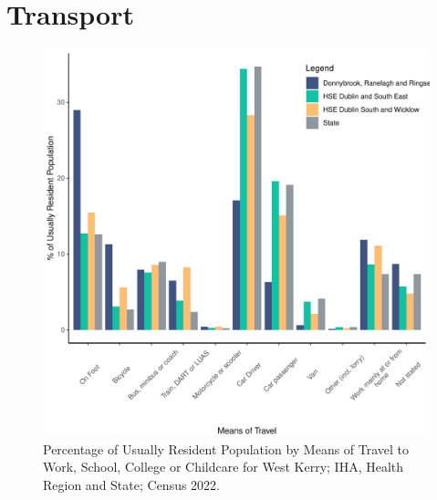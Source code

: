 \documentclass{article}
\begin{document}
\section{Transport}\label{sect:Trans}
\begin{figure}[H]
	\centering
	\includegraphics[width = 120mm]{../figures/TravelED.pdf}
	\caption{Percentage of Usually Resident Population by Means of Travel to Work, School, College or Childcare for West Kerry; IHA, Health Region and State; Census 2022.}
	\label{fig:vbnv}
	\end{figure}
\end{document}
